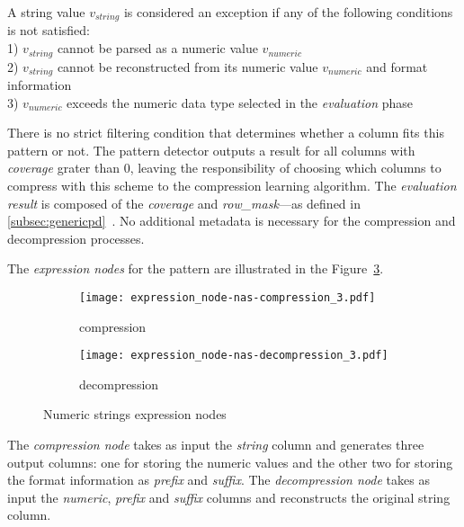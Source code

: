 A string value \(v_{string}\) is considered an exception if any of the following conditions is not satisfied:\\
1) \(v_{string}\) cannot be parsed as a numeric value \(v_{numeric}\)\\
2) \(v_{string}\) cannot be reconstructed from its numeric value \(v_{numeric}\) and format information\\
3) \(v_{numeric}\) exceeds the numeric data type selected in the \textit{evaluation} phase

There is no strict filtering condition that determines whether a column fits this pattern or not. The pattern detector outputs a result for all columns with \textit{coverage} grater than \(0\), leaving the responsibility of choosing which columns to compress with this scheme to the compression learning algorithm. The \textit{evaluation result} is composed of the \textit{coverage} and \textit{row\_mask}---as defined in \ref{subsec:genericpd}~. No additional metadata is necessary for the compression and decompression processes.

The \textit{expression nodes} for the  pattern are illustrated in the Figure~\ref{fig:pd:numericstrings:exprnode}.

\begin{figure}[h]
  \centering
  \begin{subfigure}[t]{0.49\linewidth}
    \centering
    \texttt{[image: expression\_node-nas-compression\_3.pdf]}
    \caption[b]{compression}
    \label{fig:pd:numericstrings:exprnode:compression}
  \end{subfigure}
  \begin{subfigure}[t]{0.49\linewidth}
    \centering
    \texttt{[image: expression\_node-nas-decompression\_3.pdf]}
    \caption[b]{decompression}
    \label{fig:pd:numericstrings:exprnode:decompression}
  \end{subfigure}
  \caption{Numeric strings expression nodes}
  \label{fig:pd:numericstrings:exprnode}
\end{figure}

The \textit{compression node} takes as input the \textit{string} column and generates three output columns: one for storing the numeric values and the other two for storing the format information as \textit{prefix} and \textit{suffix}. The \textit{decompression node} takes as input the \textit{numeric}, \textit{prefix} and \textit{suffix} columns and reconstructs the original string column.

